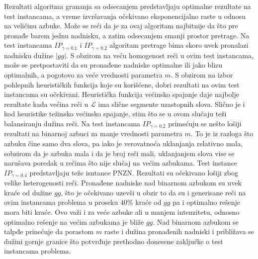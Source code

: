 \documentclass[12pt,oneside]{memoir}
\begin{document}
Rezultati algoritma grananja sa odsecanjem predstavljaju optimalne rezultate
na test instancama, a vreme izvršavanja očekivano eksponencijalno raste u odnosu na
veličinu azbuke. Može se reći da je za ovaj algoritam najbitnije da što pre pronađe barem jednu
nadnisku, a zatim odsecanjem smanji prostor pretrage.
Na test instancama $IP_{\gamma=0.1}$ i $IP_{\gamma=0.2}$ algoritam pretrage bima
skoro uvek pronalazi nadnisku dužine $|gg|$. S obzirom na veću homogenost reči
u ovim test instancama, može se pretpostaviti da su pronađene nadniske
optimalne ili jako blizu optimalnih, a pogotovo za veće vrednosti parametra $m$.
S obzirom na izbor pohlepnih heurističkih funkcija koje su korišćene,
dobri rezultati na ovim test instancama su očekivani.
Heuristička funkcija većinsko spajanje daje najbolje rezultate
kada većina reči u $\mathcal{L}$ ima slične segmente uzastopnih slova.
Slično je i kod heuristike težinsko većinsko spajanje, stim što se u ovom
slučaju teži balansiranju dužina reči.
Na test instancama $IP_{\gamma=0.2}$ primećuju se nešto lošiji rezultati
na binarnoj azbuci za manje vrednosti parametra $m$. To je iz razloga
što azbuku čine samo dva slova, pa iako je verovatnoća uklanjanja relativno mala,
sobzirom da je azbuka mala i da je broj reči mali, uklanjanjem
slova vise se narušava poredak u rečima što nije slučaj na većim azbukama.
Test instance $IP_{\gamma=0.4}$ predstavljaju teže isntance PNZN.
Rezultati su očekivano lošiji zbog velike heterogenosti reči. Pronađene nadniske nad binarnom azbukom
su uvek kraće od dužine $gg$, što je očekivano uzevši u obzir to da su i generisane
reči na ovim instancama problema u proseku $40\%$ kraće od $gg$ pa i optimalno rešenje
mora biti kraće. Ovo važi i za veće azbuke ali u manjem intenzitetu,
odnosno optimalno rešenje na većim azbukama je bliže $gg$.
Nad binarnom azbukom se talpđe prinećuje da porastom $m$ raste i dužina pronađenih nadniski
i približava se dužini gornje granice što potvrđuje prethodno donesene zaključke
o test instancama problema.
\end{document}
